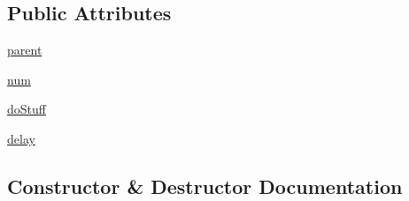 \subsection*{Public Attributes}
\begin{DoxyCompactItemize}
\item 
\hyperlink{classdriver_1_1LOGITECH__GAMEPAD__DRIVER_1_1LogitechGamepadDriver_1_1GamepadThread_abede3a32608fc0d308e1cebcbd507eef}{parent}
\item 
\hyperlink{classdriver_1_1LOGITECH__GAMEPAD__DRIVER_1_1LogitechGamepadDriver_1_1GamepadThread_a01174be3f4261cd2dc0510a95907ae24}{num}
\item 
\hyperlink{classdriver_1_1LOGITECH__GAMEPAD__DRIVER_1_1LogitechGamepadDriver_1_1GamepadThread_a013099b962d25f2d0b6ed991527ba55b}{do\+Stuff}
\item 
\hyperlink{classdriver_1_1LOGITECH__GAMEPAD__DRIVER_1_1LogitechGamepadDriver_1_1GamepadThread_aefd0103bf5744b989ad40c8545f35388}{delay}
\end{DoxyCompactItemize}


\subsection{Constructor \& Destructor Documentation}
\hypertarget{classdriver_1_1LOGITECH__GAMEPAD__DRIVER_1_1LogitechGamepadDriver_1_1GamepadThread_aa08ed3fd5770b7518dd3c3672adb37d3}{}

